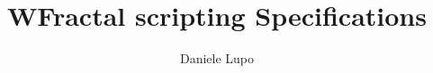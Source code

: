 


\author{Daniele Lupo}
\title{WFractal scripting Specifications}

\initialpagetecnicdocument
\tableofcontents
\listoffigures
\listoftables





